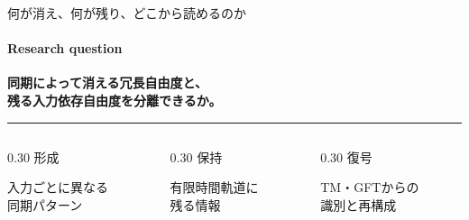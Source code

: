 \documentclass[aspectratio=169,11pt]{beamer}
\begin{document}
\begin{frame}{何が消え、何が残り、どこから読めるのか}
  \framesubtitle{Research question}
  {\large\bfseries\color{researchink}
  同期によって消える冗長自由度と、\\
  残る入力依存自由度を分離できるか。\par}
  \vspace{4mm}
  \color{researchline}\rule{\textwidth}{0.4pt}
  \vspace{2mm}
  \begin{columns}[T,onlytextwidth]
    \begin{column}{0.30\textwidth}
      {\color{researchblue}\large 形成}\par\vspace{2mm}
      {\normalsize\color{researchbody}入力ごとに異なる\\同期パターン}
    \end{column}
    \begin{column}{0.30\textwidth}
      {\color{researchblue}\large 保持}\par\vspace{2mm}
      {\normalsize\color{researchbody}有限時間軌道に\\残る情報}
    \end{column}
    \begin{column}{0.30\textwidth}
      {\color{researchblue}\large 復号}\par\vspace{2mm}
      {\normalsize\color{researchbody}TM・GFTからの\\識別と再構成}
    \end{column}
  \end{columns}
\end{frame}
\end{document}
